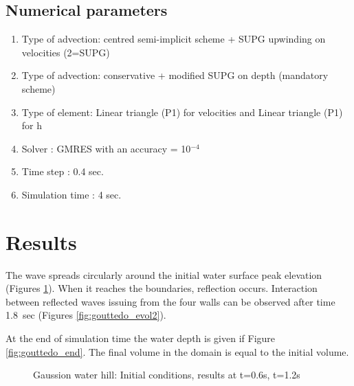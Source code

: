 \subsection{Numerical parameters}
\begin{enumerate}
\item Type of advection: centred semi-implicit scheme + SUPG upwinding on
  velocities (2=SUPG)
\item Type of advection:  conservative + modified SUPG on depth (mandatory
  scheme)
\item  Type of element: Linear triangle (P1) for velocities and  Linear
  triangle (P1) for h
\item Solver : GMRES with an accuracy =  10${}^{-4}$
\item Time step : 0.4 sec.
\item Simulation time : 4 sec.
\end{enumerate}
%
%
\section{Results}
%

The wave spreads circularly around the initial water surface peak elevation
(Figures \ref{fig:gouttedo_evol}). When it reaches the boundaries, reflection
occurs. Interaction between reflected waves issuing from the four walls can be
observed after time 1.8~sec (Figures \ref{fig:gouttedo_evol2}).

At the end of simulation time the water depth is given if Figure
\ref{fig:gouttedo_end}. The final volume in the domain is equal to the initial
volume.
\begin{figure}
\caption{Gaussion water hill: Initial conditions, results at t=0.6s, t=1.2s} \label{fig:gouttedo_evol}
\end{figure}

